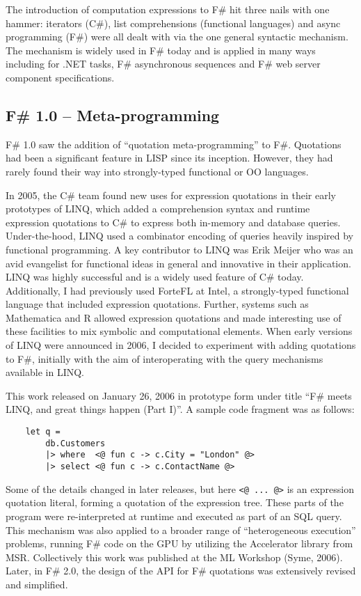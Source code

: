\documentclass[acmsmall,review]{acmart}\settopmatter{printfolios=true,printccs=false,printacmref=false}
\begin{document}
The introduction of computation expressions to F\# hit three nails with one hammer: iterators (C\#), list comprehensions (functional languages) and async programming (F\#) were all dealt with via the one general syntactic mechanism.  The mechanism is widely used in F\# today and is applied in many ways including for .NET tasks, F\# asynchronous sequences and F\# web server component specifications.

\subsection*{F\# 1.0 – Meta-programming}

F\# 1.0 saw the addition of “quotation meta-programming” to F\#.  Quotations had been a significant feature in LISP since its inception. However, they had rarely 
found their way into strongly-typed functional or OO languages.  


In 2005, the C\# team found new uses for expression quotations in their early prototypes of LINQ, which added a comprehension syntax and runtime expression quotations to C\# to express both in-memory and database queries. Under-the-hood, LINQ used a combinator encoding of queries heavily inspired by functional programming. A key contributor to LINQ was Erik Meijer who was an avid evangelist for functional ideas in general and innovative in their application. LINQ was highly successful and is a widely used feature of C\# today.  Additionally, I had previously used ForteFL at Intel, a strongly-typed functional language that included expression quotations.  Further, systems such as Mathematica and R allowed expression quotations and made interesting use of these facilities to mix symbolic and computational elements. When early versions of LINQ were announced in 2006, I decided to experiment with adding quotations to F\#, initially with the aim of interoperating with the query mechanisms available in LINQ.  

This work released on January 26, 2006 in prototype form under title “F\# meets LINQ, and great things happen (Part I)”.   A sample code fragment was as follows:

\begin{verbatim}
    let q =
        db.Customers
        |> where  <@ fun c -> c.City = "London" @> 
        |> select <@ fun c -> c.ContactName @>
\end{verbatim}
Some of the details changed in later releases, but here \verb$<@ ... @>$ is an expression quotation literal, forming a quotation of the expression tree. These parts of the program were re-interpreted at runtime and executed as part of an SQL query.  This mechanism was also applied to a broader range of “heterogeneous execution” problems, running F\# code on the GPU by utilizing the Accelerator library from MSR. Collectively this work was published at the ML Workshop (Syme, 2006). Later, in F\# 2.0, the design of the API for F\# quotations was extensively revised and simplified.
\end{document}
